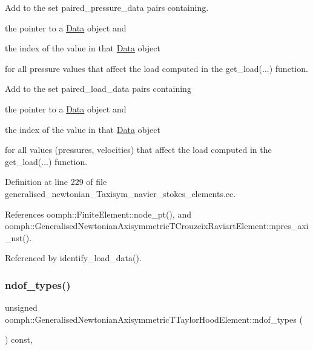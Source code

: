 Add to the set {\ttfamily paired\+\_\+pressure\+\_\+data} pairs containing. 


\begin{DoxyItemize}
\item the pointer to a \hyperlink{classoomph_1_1Data}{Data} object and
\item the index of the value in that \hyperlink{classoomph_1_1Data}{Data} object
\end{DoxyItemize}for all pressure values that affect the load computed in the {\ttfamily get\+\_\+load}(...) function.

Add to the set {\ttfamily paired\+\_\+load\+\_\+data} pairs containing
\begin{DoxyItemize}
\item the pointer to a \hyperlink{classoomph_1_1Data}{Data} object and
\item the index of the value in that \hyperlink{classoomph_1_1Data}{Data} object
\end{DoxyItemize}for all values (pressures, velocities) that affect the load computed in the {\ttfamily get\+\_\+load}(...) function. 

Definition at line 229 of file generalised\+\_\+newtonian\+\_\+\+Taxisym\+\_\+navier\+\_\+stokes\+\_\+elements.\+cc.



References oomph\+::\+Finite\+Element\+::node\+\_\+pt(), and oomph\+::\+Generalised\+Newtonian\+Axisymmetric\+T\+Crouzeix\+Raviart\+Element\+::npres\+\_\+axi\+\_\+nst().



Referenced by identify\+\_\+load\+\_\+data().

\mbox{\label{classoomph_1_1GeneralisedNewtonianAxisymmetricTTaylorHoodElement_ab5b87110b4a1c13ab828c259a28d2d36}} 
\subsubsection{\texorpdfstring{ndof\+\_\+types()}{ndof\_types()}}
{\footnotesize\ttfamily unsigned oomph\+::\+Generalised\+Newtonian\+Axisymmetric\+T\+Taylor\+Hood\+Element\+::ndof\+\_\+types (\begin{DoxyParamCaption}{ }\end{DoxyParamCaption}) const\hspace{0.3cm}{\ttfamily [inline]}, {\ttfamily [virtual]}}



